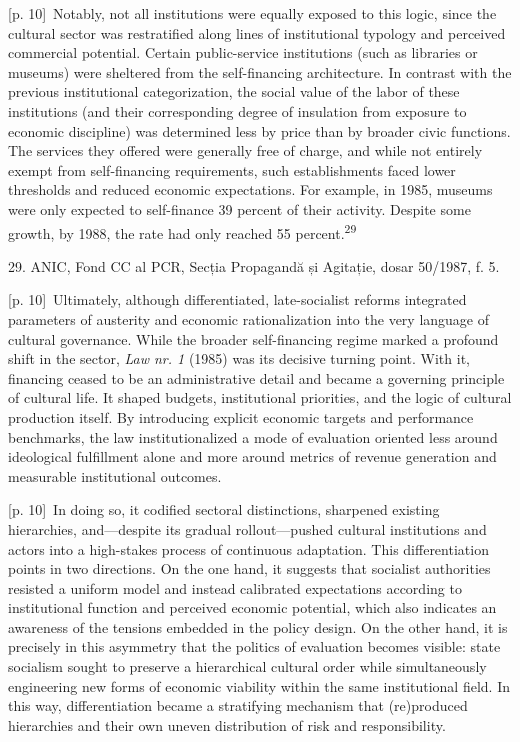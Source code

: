 \documentclass[10pt,a4paper]{article}
\begin{document}
{\scriptsize\color{gray} [p. 10]}\ Notably, not all institutions were equally exposed to this logic, since the cultural sector was restratified along lines of institutional typology and perceived commercial potential. Certain public-service institutions (such as libraries or museums) were sheltered from the self-financing architecture. In contrast with the previous institutional categorization, the social value of the labor of these institutions (and their corresponding degree of insulation from exposure to economic discipline) was determined less by price than by broader civic functions. The services they offered were generally free of charge, and while not entirely exempt from self-financing requirements, such establishments faced lower thresholds and reduced economic expectations. For example, in 1985, museums were only expected to self-finance 39 percent of their activity. Despite some growth, by 1988, the rate had only reached 55 percent.\nobreak\textsuperscript{29}\par{\small 29. ANIC, Fond CC al PCR, Secția Propagandă și Agitație, dosar 50/1987, f. 5.\par}
{\scriptsize\color{gray} [p. 10]}\ Ultimately, although differentiated, late-socialist reforms integrated parameters of austerity and economic rationalization into the very language of cultural governance. While the broader self-financing regime marked a profound shift in the sector, \textit{Law nr. 1} (1985) was its decisive turning point. With it, financing ceased to be an administrative detail and became a governing principle of cultural life. It shaped budgets, institutional priorities, and the logic of cultural production itself. By introducing explicit economic targets and performance benchmarks, the law institutionalized a mode of evaluation oriented less around ideological fulfillment alone and more around metrics of revenue generation and measurable institutional outcomes.\par
{\scriptsize\color{gray} [p. 10]}\ In doing so, it codified sectoral distinctions, sharpened existing hierarchies, and—despite its gradual rollout—pushed cultural institutions and actors into a high-stakes process of continuous adaptation. This differentiation points in two directions. On the one hand, it suggests that socialist authorities resisted a uniform model and instead calibrated expectations according to institutional function and perceived economic potential, which also indicates an awareness of the tensions embedded in the policy design. On the other hand, it is precisely in this asymmetry that the politics of evaluation becomes visible: state socialism sought to preserve a hierarchical cultural order while simultaneously engineering new forms of economic viability within the same institutional field. In this way, differentiation became a stratifying mechanism that (re)produced hierarchies and their own uneven distribution of risk and responsibility.\par
\end{document}
